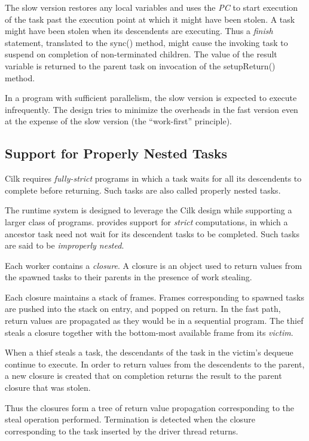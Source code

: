The slow version restores any local variables and uses the {\em PC} to
start execution of the task past the execution point at which it might
have been stolen. A task might have been stolen when its descendents
are executing. Thus a {\em finish} statement, translated to the
{\java sync()} method, might cause the invoking task to suspend on
completion of non-terminated children. The value of the {\java result} 
variable is returned to the parent task on invocation of the
{\java setupReturn()} method. 

In a program with sufficient parallelism, the slow version is expected
to execute infrequently. The design tries to minimize the overheads in
the fast version even at the expense of the slow version (the
``work-first'' principle).

\subsection{Support for Properly Nested Tasks}
Cilk requires {\em fully-strict} programs
in which a task waits for all its descendents to complete before
returning. Such tasks are also called properly nested tasks. 

The \Xten{} runtime system is designed to leverage the Cilk design while
supporting a larger class of programs. \Xten{} provides support for {\em
strict} computations, in which a ancestor task need not wait for its
descendent tasks to be completed. Such tasks are said to be {\em improperly
nested}. 

Each worker contains a {\em closure}. A closure is an  object used
to return values from the spawned tasks to their parents in the
presence of work stealing.  

Each closure maintains a stack of frames. Frames corresponding to
spawned tasks are pushed into the stack on entry, and popped on
return. In the fast path, return values are propagated as they would
be in a sequential program. The thief steals a closure together with
the bottom-most available frame from its
{\em victim}.

When a thief steals a task, the descendants of the task in the
victim's dequeue continue to execute.  In order to return values from
the descendents to the parent, a new closure is created that on
completion returns the result to the parent closure that was stolen.

Thus the closures form a tree of return value propagation
corresponding to the steal operation performed. Termination is
detected when the closure corresponding to the task inserted by the
driver thread returns. 

